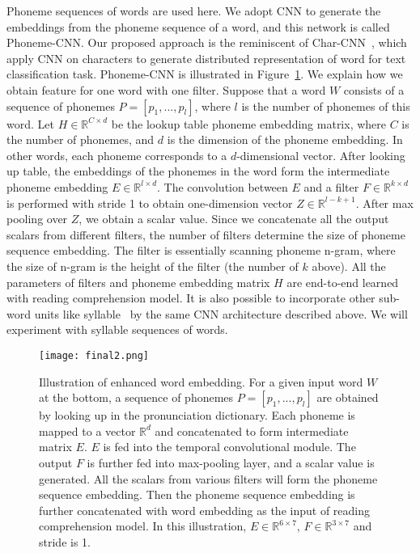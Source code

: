 \documentclass[a4paper]{article}
\begin{document}
Phoneme sequences of words are used here.
We adopt CNN to generate the  embeddings from the phoneme sequence of a word, and this network is called Phoneme-CNN. 
Our proposed approach is the reminiscent of Char-CNN~\cite{zhang2015character,kim2016character}, which apply CNN on characters to generate distributed representation of word for text classification task. 
Phoneme-CNN is illustrated in Figure~\ref{fig:phonemeCNN}.
We explain how we obtain feature for one word with one filter. 
Suppose that a word $W$ consists of a sequence of phonemes $P = [p_1,...,p_l]$, where $l$ is the number of phonemes of this word. 
Let $H \in \mathbb{R}^{C \times d}$ be the lookup table phoneme embedding matrix, where $C$ is the number of  phonemes, and $d$ is the dimension  of the phoneme embedding. 
In other words, each phoneme corresponds to a $d$-dimensional vector.
After looking up table, the embeddings of the phonemes in the word form the intermediate phoneme embedding $E \in \mathbb{R}^{l \times d}$. The convolution between $E$ and a filter $F \in \mathbb{R}^{k \times d}$ is performed with stride 1 to obtain one-dimension vector $Z \in \mathbb{R}^{l-k+1}$. After max pooling over $Z$, we obtain a scalar value. 
Since we concatenate all the output scalars from different filters, the number of filters determine the size of phoneme sequence embedding. 
The filter is essentially scanning phoneme n-gram, where the size of n-gram is the height of the filter (the number of $k$ above). All the parameters of filters  and phoneme embedding matrix $H$ are end-to-end learned with reading comprehension model. 
It  is also possible to incorporate other sub-word units like syllable~\cite{luong2013better,botha2014compositional,bian2014knowledge} by the same CNN architecture described above. We will experiment with syllable sequences of words.





\begin{figure}[t]
  \centering
  \texttt{[image: final2.png]}
  \caption{Illustration of enhanced word embedding. 
  For a given input word $W$ at the bottom, a sequence of phonemes $P = [p_1,...,p_l]$ are obtained by looking up in the pronunciation dictionary. 
  Each phoneme is mapped to a vector $ \mathbb{R}^{d}$ and concatenated to form intermediate matrix $E$.
  $E$ is fed into the temporal convolutional module. 
  The output $F$ is further fed into max-pooling layer, and a scalar value is generated. All the scalars from various filters will form the phoneme sequence embedding. 
  Then the phoneme sequence embedding is further concatenated with word embedding as the input  of reading comprehension model.  In this illustration,  $E \in \mathbb{R}^{6 \times 7}$, $F \in \mathbb{R}^{3 \times 7}$ and stride is 1.}
  \label{fig:phonemeCNN}
\end{figure}
\end{document}
